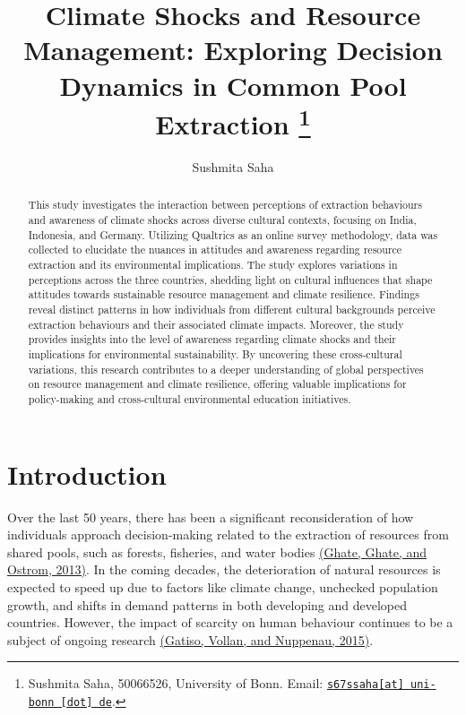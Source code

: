 \documentclass[11pt, a4paper, leqno]{article}
\begin{document}
\title{Climate Shocks and Resource Management: Exploring Decision Dynamics in Common Pool Extraction \thanks{Sushmita Saha, 50066526, University of Bonn. Email: \href{mailto:s67ssaha@uni-bonn.de}{\nolinkurl{s67ssaha[at] uni-bonn [dot] de}}.}}

\author{Sushmita Saha}
\date{}
\maketitle
\begin{abstract}
This study investigates the interaction between perceptions of extraction behaviours and awareness of climate shocks across diverse cultural contexts, focusing on India, Indonesia, and Germany. Utilizing Qualtrics as an online survey methodology, data was collected to elucidate the nuances in attitudes and awareness regarding resource extraction and its environmental implications. The study explores variations in perceptions across the three countries, shedding light on cultural influences that shape attitudes towards sustainable resource management and climate resilience. Findings reveal distinct patterns in how individuals from different cultural backgrounds perceive extraction behaviours and their associated climate impacts. Moreover, the study provides insights into the level of awareness regarding climate shocks and their implications for environmental sustainability. By uncovering these cross-cultural variations, this research contributes to a deeper understanding of global perspectives on resource management and climate resilience, offering valuable implications for policy-making and cross-cultural environmental education initiatives.
\end{abstract}



\clearpage
\section{Introduction}\label{sec:introduction}

Over the last 50 years, there has been a significant reconsideration of how individuals approach decision-making related to the extraction of resources from shared pools, such as forests, fisheries, and water bodies  \href{https://api.semanticscholar.org/CorpusID:54717731}{(Ghate, Ghate, and Ostrom, 2013)}. In the coming decades, the deterioration of natural resources is expected to speed up due to factors like climate change, unchecked population growth, and shifts in demand patterns in both developing and developed countries. However, the impact of scarcity on human behaviour continues to be a subject of ongoing research \href{https://api.semanticscholar.org/CorpusID:155012795}{(Gatiso, Vollan, and Nuppenau, 2015)}. 
\end{document}
